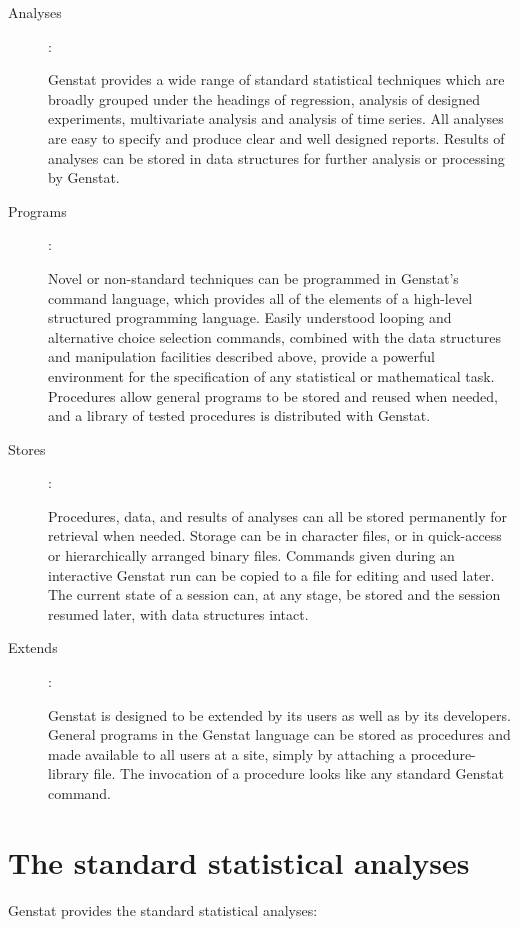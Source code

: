 \begin{description}
\item [Analyses]:

Genstat provides a wide range of standard statistical techniques which are
broadly grouped under the headings of regression, analysis of designed
experiments, multivariate analysis and analysis of time series.
All analyses are easy to specify and produce clear and well designed reports.
Results of analyses can be stored in data structures for further analysis or
processing by Genstat.

\item [Programs]:

Novel or non-standard techniques can be programmed in Genstat's command
language, which provides all of the elements of a high-level structured
programming language.
Easily understood looping and alternative choice selection commands,
combined with the data structures and manipulation facilities described
above, provide a powerful environment for the specification of any
statistical or mathematical task.
Procedures allow general programs to be stored and reused when needed, and
a library of tested procedures is distributed with Genstat.

\item [Stores]:

Procedures, data, and results of analyses can all be stored permanently
for retrieval when needed.
Storage can be in character files, or in quick-access or hierarchically
arranged binary files.
Commands given during an interactive Genstat run can be copied to a file
for editing and used later.
The current state of a session can, at any stage, be stored and the session
resumed later, with data structures intact.

\item [Extends]:

Genstat is designed to be extended by its users as well as by its developers.
General programs in the Genstat language can be stored as procedures and
made available to all users at a site, simply by attaching a
procedure-library file.
The invocation of a procedure looks like any standard Genstat command.
\end{description}

\section{The standard statistical analyses}

Genstat provides the standard statistical analyses:

